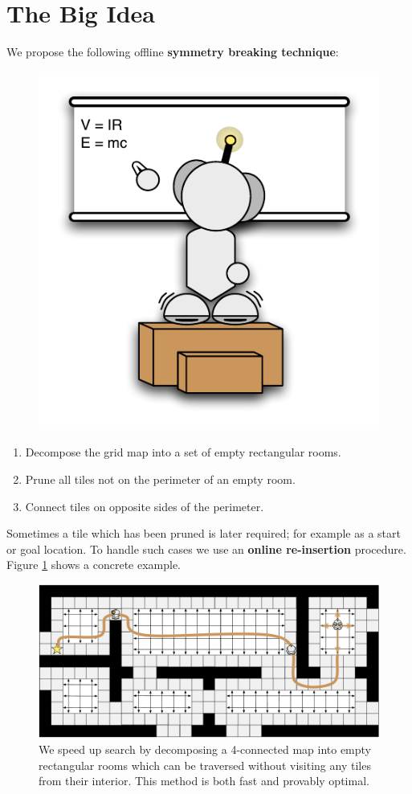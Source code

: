 \section{The Big Idea}
We propose the following offline \textbf{symmetry breaking technique}: 
 \begin{figure}
       \vspace{2em}
		\includegraphics[width=0.25\columnwidth, trim=10mm 10mm 10mm 10mm]{diagrams/robot_whiteboard.pdf}
 \end{figure}
\begin{enumerate}
\item{Decompose the grid map into a set of empty rectangular rooms.}
\item{Prune all tiles not on the perimeter of an empty room.}
\item{Connect tiles on opposite sides of the perimeter.}
\end{enumerate}
\vspace{1em}
Sometimes a tile which has been pruned is later required; for example as a start
or goal location. 
To handle such cases we use an \textbf{online re-insertion} procedure.
Figure \ref{fig:splash} shows a concrete example.

\begin{figure}[t]
\hspace{0.35in}
\begin{minipage}{17in}
\label{fig:splash}
\begin{center}
\includegraphics[width=17in]{diagrams/robot_map.pdf}
\caption{We speed up search by decomposing a 4-connected map into empty rectangular
rooms which can be traversed without visiting any tiles from their interior.
This method is both fast and provably optimal.}
\end{center}
\end{minipage}
\vspace{2em}
\end{figure}

\pagebreak

